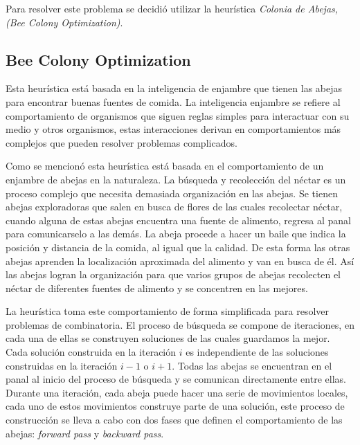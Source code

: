 \documentclass[12pt]{article}
\begin{document}
	Para resolver este problema se decidió utilizar la heurística \textit{Colonia de 
	Abejas, (Bee Colony Optimization)}.

  	\subsection{Bee Colony Optimization}
  	
  	Esta heurística está basada en la inteligencia de enjambre que tienen las abejas
  	para encontrar buenas fuentes de comida.
  	La inteligencia enjambre se refiere al comportamiento de organismos que siguen
  	reglas simples para interactuar con su medio y otros organismos, estas 
  	interacciones derivan en comportamientos más complejos que pueden resolver 
  	problemas complicados.
  	
  	Como se mencionó esta heurística está basada en el comportamiento de un enjambre 
  	de abejas en la naturaleza. La búsqueda y recolección del néctar es un proceso
  	complejo que necesita demasiada organización en las abejas. Se tienen abejas 
  	exploradoras que salen en busca de flores de las cuales recolectar néctar, cuando
  	alguna de estas abejas encuentra una fuente de alimento, regresa al panal para
  	comunicarselo a las demás. La abeja procede a hacer un baile que indica
  	la posición y distancia de la comida, al igual que la calidad. De esta forma las 
  	otras abejas aprenden la localización aproximada del alimento y van en busca de 
  	él. Así las abejas logran	la organización para que varios grupos de
  	abejas recolecten el néctar de diferentes fuentes de alimento y se concentren en 
  	las mejores.
	
  	La heurística toma este comportamiento de forma simplificada para resolver
  	problemas de combinatoria. El proceso de búsqueda se compone de iteraciones, en 
  	cada una de ellas se construyen soluciones de las cuales guardamos la mejor.
  	Cada solución construida en la iteración $i$ es independiente de las soluciones
  	construidas en la iteración $i-1$ o $i+1$.
  	Todas las abejas se encuentran en el panal al inicio
  	del proceso de búsqueda y se comunican directamente entre ellas. Durante una 
  	iteración, cada abeja puede hacer una serie de movimientos locales, cada uno de 
  	estos movimientos construye parte de una solución, este proceso de construcción
  	se lleva a cabo con dos fases que definen el comportamiento de las abejas:
  	\textit{forward pass} y \textit{backward pass}.
  	
\end{document}
